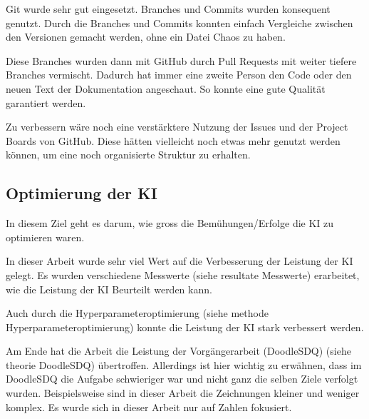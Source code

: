 Git wurde sehr gut eingesetzt. Branches und Commits wurden konsequent genutzt.
Durch die Branches und Commits konnten einfach Vergleiche zwischen den Versionen
gemacht werden, ohne ein Datei Chaos zu haben.

Diese Branches wurden dann mit GitHub durch Pull Requests mit weiter tiefere
Branches vermischt. Dadurch hat immer eine zweite Person den Code oder den neuen
Text der Dokumentation angeschaut. So konnte eine gute Qualität garantiert
werden.


Zu verbessern wäre noch eine verstärktere Nutzung der Issues und der Project
Boards von GitHub. Diese hätten vielleicht noch etwas mehr genutzt werden
können, um eine noch organisierte Struktur zu erhalten.



\subsection*{Optimierung der KI}
In diesem Ziel geht es darum, wie gross die Bemühungen/Erfolge die KI zu
optimieren waren.

In dieser Arbeit wurde sehr viel Wert auf die Verbesserung der Leistung der KI
gelegt. Es wurden verschiedene Messwerte (siehe resultate Messwerte) erarbeitet,  %
wie die Leistung der KI Beurteilt werden kann.

Auch durch die Hyperparameteroptimierung (siehe methode Hyperparameteroptimierung) %
konnte die Leistung der KI stark verbessert werden.

Am Ende hat die Arbeit die Leistung der Vorgängerarbeit (DoodleSDQ) (siehe theorie  %
DoodleSDQ) übertroffen. Allerdings ist hier wichtig zu erwähnen, dass im
DoodleSDQ die Aufgabe schwieriger war und nicht ganz die selben Ziele verfolgt
wurden. Beispielsweise sind in dieser Arbeit die Zeichnungen kleiner und weniger
komplex. Es wurde sich in dieser Arbeit nur auf Zahlen fokusiert.


